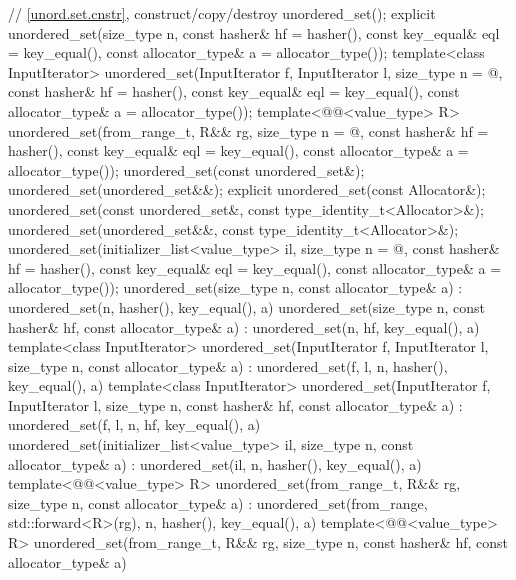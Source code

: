 \begin{codeblock}
{{    // \ref{unord.set.cnstr}, construct/copy/destroy
    unordered_set();
    explicit unordered_set(size_type n,
                           const hasher& hf = hasher(),
                           const key_equal& eql = key_equal(),
                           const allocator_type& a = allocator_type());
    template<class InputIterator>
      unordered_set(InputIterator f, InputIterator l,
                    size_type n = @\seebelow@,
                    const hasher& hf = hasher(),
                    const key_equal& eql = key_equal(),
                    const allocator_type& a = allocator_type());
    template<@@<value_type> R>
      unordered_set(from_range_t, R&& rg,
                    size_type n = @\seebelow@,
                    const hasher& hf = hasher(),
                    const key_equal& eql = key_equal(),
                    const allocator_type& a = allocator_type());
    unordered_set(const unordered_set&);
    unordered_set(unordered_set&&);
    explicit unordered_set(const Allocator&);
    unordered_set(const unordered_set&, const type_identity_t<Allocator>&);
    unordered_set(unordered_set&&, const type_identity_t<Allocator>&);
    unordered_set(initializer_list<value_type> il,
                  size_type n = @\seebelow@,
                  const hasher& hf = hasher(),
                  const key_equal& eql = key_equal(),
                  const allocator_type& a = allocator_type());
    unordered_set(size_type n, const allocator_type& a)
      : unordered_set(n, hasher(), key_equal(), a) { }
    unordered_set(size_type n, const hasher& hf, const allocator_type& a)
      : unordered_set(n, hf, key_equal(), a) { }
    template<class InputIterator>
      unordered_set(InputIterator f, InputIterator l, size_type n, const allocator_type& a)
        : unordered_set(f, l, n, hasher(), key_equal(), a) { }
    template<class InputIterator>
      unordered_set(InputIterator f, InputIterator l, size_type n, const hasher& hf,
                    const allocator_type& a)
      : unordered_set(f, l, n, hf, key_equal(), a) { }
    unordered_set(initializer_list<value_type> il, size_type n, const allocator_type& a)
      : unordered_set(il, n, hasher(), key_equal(), a) { }
    template<@@<value_type> R>
      unordered_set(from_range_t, R&& rg, size_type n, const allocator_type& a)
        : unordered_set(from_range, std::forward<R>(rg), n, hasher(), key_equal(), a) { }
    template<@@<value_type> R>
      unordered_set(from_range_t, R&& rg, size_type n, const hasher& hf, const allocator_type& a)
}}
\end{codeblock}
